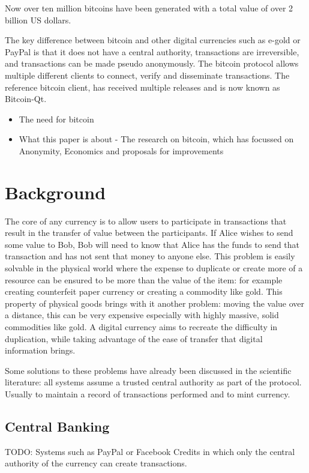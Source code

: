 Now over ten million bitcoins have been generated with a total value of over 2
billion US dollars.

The key difference between bitcoin and other digital currencies such as e-gold
or PayPal is that it does not have a central authority, transactions are
irreversible, and transactions can be made pseudo anonymously.  The bitcoin
protocol allows multiple different clients to connect, verify and disseminate
transactions.  The reference bitcoin client, has received multiple releases and
is now known as Bitcoin-Qt.

\begin{itemize} \item The need for bitcoin \item What this paper is about - The
research on bitcoin, which has focussed on Anonymity, Economics and proposals
for improvements \end{itemize}

\section{Background} The core of any currency is to allow users to participate
in transactions that result in the transfer of value between the participants.
If Alice wishes to send some value to Bob, Bob will need to know that Alice has
the funds to send that transaction and has not sent that money to anyone else.
This problem is easily solvable in the physical world where the expense to
duplicate or create more of a resource can be ensured to be more than the value
of the item: for example creating counterfeit paper currency or creating a
commodity like gold.  This property of physical goods brings with it another
problem: moving the value over a distance, this can be very expensive
especially with highly massive, solid commodities like gold.  A digital
currency aims to recreate the difficulty in duplication, while taking advantage
of the ease of transfer that digital information brings.

Some solutions to these problems have already been discussed in the scientific
literature: all systems assume a trusted central authority as part of the
protocol. Usually to maintain a record of transactions performed and to mint
currency.

\subsection{Central Banking} TODO: Systems such as PayPal or Facebook Credits
in which only the central authority of the currency can create transactions.

